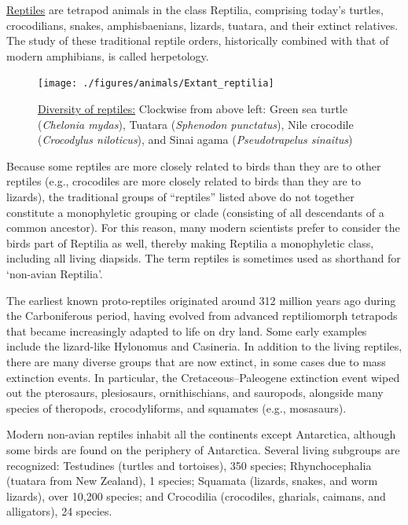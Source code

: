 \href{https://en.wikipedia.org/wiki/Reptile}{Reptiles} are tetrapod animals in the class Reptilia, comprising today's turtles, crocodilians, snakes, amphisbaenians, lizards, tuatara, and their extinct relatives. The study of these traditional reptile orders, historically combined with that of modern amphibians, is called herpetology.



\begin{figure}

{\centering \texttt{[image: ./figures/animals/Extant\_reptilia]} 

}

\caption{\href{https://commons.wikimedia.org/wiki/File:Extant_reptilia.jpg}{Diversity of reptiles:} Clockwise from above left: Green sea turtle (\emph{Chelonia mydas}), Tuatara (\emph{Sphenodon punctatus}), Nile crocodile (\emph{Crocodylus niloticus}), and Sinai agama (\emph{Pseudotrapelus sinaitus})}\label{fig:reptilediversity}
\end{figure}

Because some reptiles are more closely related to birds than they are to other reptiles (e.g., crocodiles are more closely related to birds than they are to lizards), the traditional groups of ``reptiles'' listed above do not together constitute a monophyletic grouping or clade (consisting of all descendants of a common ancestor). For this reason, many modern scientists prefer to consider the birds part of Reptilia as well, thereby making Reptilia a monophyletic class, including all living diapsids. The term reptiles is sometimes used as shorthand for `non-avian Reptilia'.

The earliest known proto-reptiles originated around 312 million years ago during the Carboniferous period, having evolved from advanced reptiliomorph tetrapods that became increasingly adapted to life on dry land. Some early examples include the lizard-like Hylonomus and Casineria. In addition to the living reptiles, there are many diverse groups that are now extinct, in some cases due to mass extinction events. In particular, the Cretaceous--Paleogene extinction event wiped out the pterosaurs, plesiosaurs, ornithischians, and sauropods, alongside many species of theropods, crocodyliforms, and squamates (e.g., mosasaurs).

Modern non-avian reptiles inhabit all the continents except Antarctica, although some birds are found on the periphery of Antarctica. Several living subgroups are recognized: Testudines (turtles and tortoises), 350 species; Rhynchocephalia (tuatara from New Zealand), 1 species; Squamata (lizards, snakes, and worm lizards), over 10,200 species; and Crocodilia (crocodiles, gharials, caimans, and alligators), 24 species.

